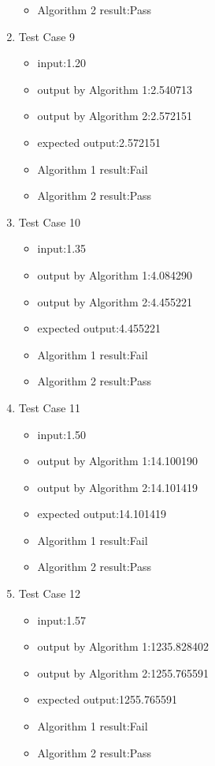 \documentclass[10pt,a4paper,twoside]{article}
\begin{document}
\begin{enumerate}
\begin{itemize}
    \item Algorithm 2 result:Pass
\end{itemize}
\item 
Test Case 9
\begin{itemize}
    \item input:1.20
    \item output by Algorithm 1:2.540713
    \item output by Algorithm 2:2.572151
    \item expected output:2.572151
    \item Algorithm 1 result:Fail
    \item Algorithm 2 result:Pass
\end{itemize}
\item 
Test Case 10
\begin{itemize}
    \item input:1.35
    \item output by Algorithm 1:4.084290
    \item output by Algorithm 2:4.455221
    \item expected output:4.455221
    \item Algorithm 1 result:Fail
    \item Algorithm 2 result:Pass
\end{itemize}
\item 
Test Case 11
\begin{itemize}
    \item input:1.50
    \item output by Algorithm 1:14.100190
    \item output by Algorithm 2:14.101419
    \item expected output:14.101419
    \item Algorithm 1 result:Fail
    \item Algorithm 2 result:Pass
\end{itemize}
\item 
Test Case 12
\begin{itemize}
    \item input:1.57
   \item output by Algorithm 1:1235.828402
    \item output by Algorithm 2:1255.765591
    \item expected output:1255.765591
    \item Algorithm 1 result:Fail
    \item Algorithm 2 result:Pass
\end{itemize}


\end{enumerate}
\end{document}

